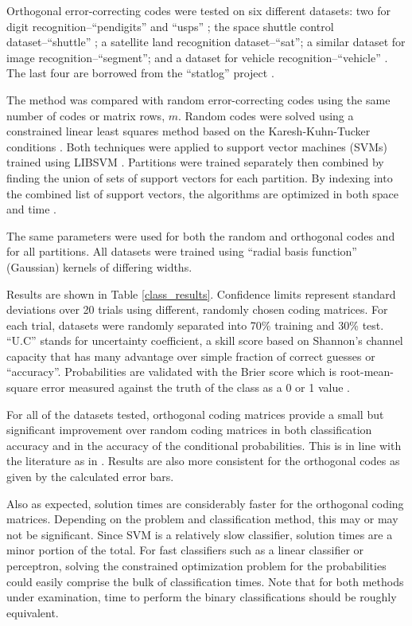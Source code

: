 Orthogonal error-correcting codes were tested on six different datasets:
two for digit recognition--``pendigits'' \citep{Alimoglu1996} and
``usps'' \citep{Hull1994}; the space shuttle control dataset--``shuttle''
\citep{King_etal1995}; a satellite land recognition
dataset--``sat''; a similar dataset for image recognition--``segment'';
and a dataset for vehicle recognition--``vehicle'' \citep{Siebert1987}.
The last four are borrowed from the ``statlog'' project \citep{King_etal1995,Michie_etal1994}.

The method was compared with random error-correcting codes using the same
number of codes or matrix rows, $m$.
Random codes were solved using a constrained linear least squares method based
on the Karesh-Kuhn-Tucker conditions \citep{Lawson_Hanson1995}.
Both techniques were applied to support vector machines (SVMs) trained using
LIBSVM \citep{Chang_Lin2011}.
Partitions were trained separately then combined by finding the union of
sets of support vectors for each partition.
By indexing into the combined list of support vectors, the algorithms are
optimized in both space and time \citep{Chang_Lin2011}.

The same parameters were used for both the random and orthogonal codes and 
for all partitions.
All datasets were trained using  ``radial basis function'' (Gaussian)
kernels of differing widths.

Results are shown in Table \ref{class_results}.
Confidence limits represent standard deviations over 20 trials using
different, randomly chosen coding matrices.
For each trial, datasets were randomly separated into 70\% training and 30\%
test.
``U.C'' stands for uncertainty
coefficient, a skill score based on Shannon's channel capacity
\citep{Shannon,Press_etal1992,Mills2011} that has many advantage over simple
fraction of correct guesses or ``accuracy''.
Probabilities are validated with the Brier score 
which is root-mean-square
error measured against the truth of the class as a 0 or 1 value
\citep{Brier1950,Jolliffe_Stephenson2003}.

For all of the datasets tested, orthogonal coding matrices provide a small but
significant improvement over random coding matrices in both classification
accuracy and in the accuracy of the conditional probabilities.
This is in line with the literature as in \citet{Dietterich_Bakiri1995,Windeatt_Ghaderi2002}.
Results are also more consistent for the orthogonal codes as given by the
calculated error bars.

Also as expected, solution times are
considerably faster for the orthogonal coding matrices.
Depending on the problem and classification method, this may or may not
be significant.
Since SVM is a relatively slow classifier, solution times
are a minor portion of the total.
For fast classifiers such as a linear classifier or perceptron,
solving the constrained optimization problem for the probabilities
could easily comprise the bulk of classification times.
Note that for both methods under examination, time to perform the binary
classifications should be roughly equivalent.

